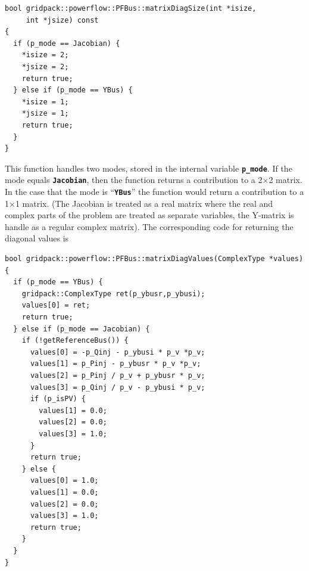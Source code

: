 \documentclass[12pt]{report} %
\begin{document}
{
\color{red}
\begin{Verbatim}[fontseries=b]
bool gridpack::powerflow::PFBus::matrixDiagSize(int *isize,
     int *jsize) const
{
  if (p_mode == Jacobian) {
    *isize = 2;
    *jsize = 2;
    return true;
  } else if (p_mode == YBus) {
    *isize = 1;
    *jsize = 1;
    return true;
  }
}
\end{Verbatim}
}

This function handles two modes, stored in the internal variable \texttt{\textbf{p\_mode}}. If the mode equals \texttt{\textbf{Jacobian}}, then the function returns a contribution to a 2$\mathrm{\times}$2 matrix. In the case that the mode is ``\texttt{\textbf{YBus}}'' the function would return a contribution to a 1$\mathrm{\times}$1 matrix. (The Jacobian is treated as a real matrix where the real and complex parts of the problem are treated as separate variables, the Y-matrix is handle as a regular complex matrix). The corresponding code for returning the diagonal values is

{
\color{red}
\begin{Verbatim}[fontseries=b]
bool gridpack::powerflow::PFBus::matrixDiagValues(ComplexType *values)
{
  if (p_mode == YBus) {
    gridpack::ComplexType ret(p_ybusr,p_ybusi);
    values[0] = ret;
    return true;
  } else if (p_mode == Jacobian) {
    if (!getReferenceBus()) {
      values[0] = -p_Qinj - p_ybusi * p_v *p_v;
      values[1] = p_Pinj - p_ybusr * p_v *p_v;
      values[2] = p_Pinj / p_v + p_ybusr * p_v;
      values[3] = p_Qinj / p_v - p_ybusi * p_v;
      if (p_isPV) {
        values[1] = 0.0;
        values[2] = 0.0;
        values[3] = 1.0;
      }
      return true;
    } else {
      values[0] = 1.0;
      values[1] = 0.0;
      values[2] = 0.0;
      values[3] = 1.0;
      return true;
    }
  }
}
\end{Verbatim}
}
\end{document}
